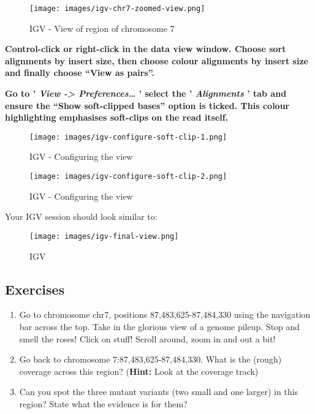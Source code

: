 \documentclass[11pt]{article}
\begin{document}
    \begin{figure}
\centering
\texttt{[image: images/igv-chr7-zoomed-view.png]}
\caption{IGV - View of region of chromosome 7}
\end{figure}

    \textbf{Control-click or right-click in the data view window. Choose
sort alignments by insert size, then choose colour alignments by insert
size and finally choose ``View as pairs''.}

\textbf{Go to ' \textit{View -\textgreater{} Preferences\ldots{}} ' select
the ' \textit{Alignments} ' tab and ensure the ``Show soft-clipped bases''
option is ticked. This colour highlighting emphasises soft-clips on the
read itself.}

    \begin{figure}
\centering
\texttt{[image: images/igv-configure-soft-clip-1.png]}
\caption{IGV - Configuring the view}
\end{figure}

    \begin{figure}
\centering
\texttt{[image: images/igv-configure-soft-clip-2.png]}
\caption{IGV - Configuring the view}
\end{figure}

    Your IGV session should look similar to:

    \begin{figure}
\centering
\texttt{[image: images/igv-final-view.png]}
\caption{IGV}
\end{figure}

    \hypertarget{exercises}{%
\subsection{Exercises}\label{exercises}}

\begin{enumerate}
\def\labelenumi{\arabic{enumi}.}
\item
  Go to chromosome chr7, positions 87,483,625-87,484,330 using the
  navigation bar across the top. Take in the glorious view of a genome
  pileup. Stop and smell the roses! Click on stuff! Scroll around, zoom
  in and out a bit!
\item
  Go back to chromosome 7:87,483,625-87,484,330. What is the (rough)
  coverage across this region? (\textbf{Hint:} Look at the coverage
  track)
\item
  Can you spot the three mutant variants (two small and one larger) in
  this region? State what the evidence is for them?
\end{enumerate}
\end{document}
